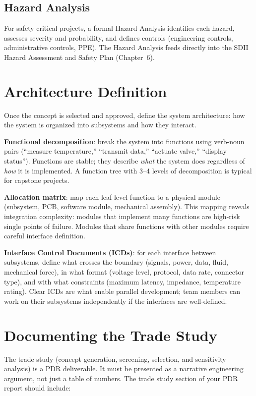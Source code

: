 \subsection{Hazard Analysis}
For safety-critical projects, a formal Hazard Analysis identifies each hazard, assesses severity and probability, and defines controls (engineering controls, administrative controls, PPE). The Hazard Analysis feeds directly into the SDII Hazard Assessment and Safety Plan (Chapter~6).

\section{Architecture Definition}
Once the concept is selected and approved, define the system architecture: how the system is organized into subsystems and how they interact.

\textbf{Functional decomposition}: break the system into functions using verb-noun pairs (``measure temperature,'' ``transmit data,'' ``actuate valve,'' ``display status''). Functions are stable; they describe \emph{what} the system does regardless of \emph{how} it is implemented. A function tree with 3--4 levels of decomposition is typical for capstone projects.

\textbf{Allocation matrix}: map each leaf-level function to a physical module (subsystem, PCB, software module, mechanical assembly). This mapping reveals integration complexity: modules that implement many functions are high-risk single points of failure. Modules that share functions with other modules require careful interface definition.

\textbf{Interface Control Documents (ICDs)}: for each interface between subsystems, define what crosses the boundary (signals, power, data, fluid, mechanical force), in what format (voltage level, protocol, data rate, connector type), and with what constraints (maximum latency, impedance, temperature rating). Clear ICDs are what enable parallel development; team members can work on their subsystems independently if the interfaces are well-defined.

\section{Documenting the Trade Study}
The trade study (concept generation, screening, selection, and sensitivity analysis) is a PDR deliverable. It must be presented as a narrative engineering argument, not just a table of numbers. The trade study section of your PDR report should include:

